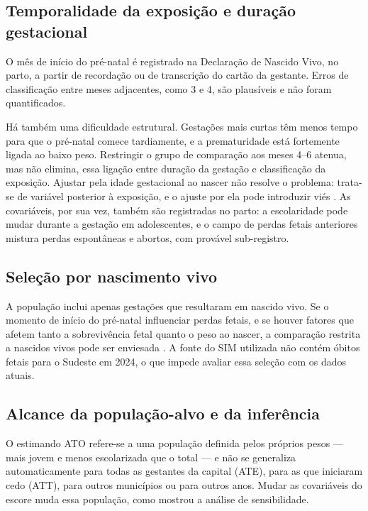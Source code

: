 \documentclass[11pt,a4paper]{article}
\begin{document}
\subsection{Temporalidade da exposição e duração gestacional}\label{sec:temporalidade}

O mês de início do pré-natal é registrado na Declaração de Nascido Vivo, no parto, a
partir de recordação ou de transcrição do cartão da gestante. Erros de classificação entre
meses adjacentes, como 3 e 4, são plausíveis e não foram quantificados.

Há também uma dificuldade estrutural. Gestações mais curtas têm menos tempo para que o
pré-natal comece tardiamente, e a prematuridade está fortemente ligada ao baixo peso.
Restringir o grupo de comparação aos meses 4--6 atenua, mas não elimina, essa ligação entre
duração da gestação e classificação da exposição. Ajustar pela idade gestacional ao nascer
não resolve o problema: trata-se de variável posterior à exposição, e o ajuste por ela
pode introduzir viés \cite{wilcox2011,schisterman2009}. As covariáveis, por sua vez, também
são registradas no parto: a escolaridade pode mudar durante a gestação em adolescentes, e
o campo de perdas fetais anteriores mistura perdas espontâneas e abortos, com provável
sub-registro.

\subsection{Seleção por nascimento vivo}

A população inclui apenas gestações que resultaram em nascido vivo. Se o momento de início
do pré-natal influenciar perdas fetais, e se houver fatores que afetem tanto a
sobrevivência fetal quanto o peso ao nascer, a comparação restrita a nascidos vivos pode
ser enviesada \cite{snowden2018}. A fonte do SIM utilizada não contém óbitos fetais para
o Sudeste em 2024, o que impede avaliar essa seleção com os dados atuais.

\subsection{Alcance da população-alvo e da inferência}

O estimando ATO refere-se a uma população definida pelos próprios pesos --- mais jovem e
menos escolarizada que o total --- e não se generaliza automaticamente para todas as
gestantes da capital (ATE), para as que iniciaram cedo (ATT), para outros municípios ou
para outros anos. Mudar as covariáveis do escore muda essa população, como mostrou a
análise de sensibilidade.
\end{document}
